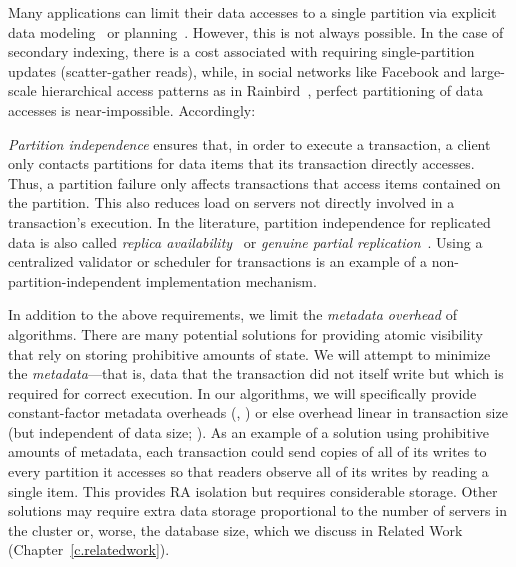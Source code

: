 Many applications can limit their data accesses to a single
partition via explicit data
modeling~\cite{gstore,espresso,megastore,helland-trans} or
planning~\cite{schism,pavlo-partition}. However, this is not always
possible. In the case of secondary indexing, there is a cost
associated with requiring single-partition updates (scatter-gather
reads), while, in social networks like Facebook and large-scale
hierarchical access patterns as in Rainbird~\cite{rainbird}, perfect partitioning of
data accesses is near-impossible. Accordingly:

\vspace{.5em}\noindent\textit{Partition independence} ensures that, in
order to execute a transaction, a client only contacts partitions for
data items that its transaction directly accesses. Thus, a partition
failure only affects transactions that access items contained on the
partition. This also reduces load on servers not directly involved in
a transaction's execution. In the literature, partition independence
for replicated data is also called \textit{replica
  availability}~\cite{hat-vldb} or \textit{genuine partial
  replication}~\cite{gpr}. Using a centralized validator or scheduler
for transactions is an example of a non-partition-independent
implementation mechanism.\vspace{.5em}

In addition to the above requirements, we limit the \textit{metadata
  overhead} of algorithms. There are many potential solutions for
providing atomic visibility that rely on storing prohibitive amounts
of state. We will attempt to minimize the \textit{metadata}---that is,
data that the transaction did not itself write but which is required
for correct execution. In our algorithms, we will specifically provide
constant-factor metadata overheads (\raps, \rapb) or else overhead
linear in transaction size (but independent of data size; \rapl). As
an example of a solution using prohibitive amounts of metadata, each
transaction could send copies of all of its writes to every partition
it accesses so that readers observe all of its writes by reading a
single item. This provides RA isolation but requires considerable
storage. Other solutions may require extra data storage proportional
to the number of servers in the cluster or, worse, the database size,
which we discuss in Related Work (Chapter~\ref{c.relatedwork}).

